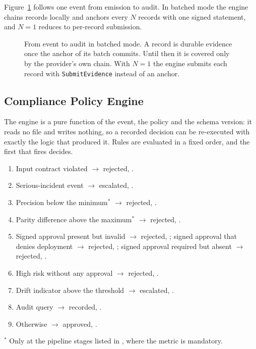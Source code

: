 Figure~\ref{fig:sequence} follows one event from emission to audit. In batched mode the engine chains records locally and anchors every $N$ records with one signed statement, and $N=1$ reduces to per-record submission.

\begin{figure}[t]
\centering
\resizebox{\textwidth}{!}{}
\caption{From event to audit in batched mode. A record is durable evidence once the anchor of its batch commits. Until then it is covered only by the provider's own chain. With $N=1$ the engine submits each record with \texttt{SubmitEvidence} instead of an anchor.}
\label{fig:sequence}
\end{figure}

\subsection{Compliance Policy Engine}

The engine is a pure function of the event, the policy and the schema version: it reads no file and writes nothing, so a recorded decision can be re-executed with exactly the logic that produced it. Rules are evaluated in a fixed order, and the first that fires decides.

\begin{enumerate}[label=\arabic*., leftmargin=*, itemsep=1pt, topsep=3pt]\footnotesize
\item Input contract violated $\rightarrow$ rejected, .
\item Serious-incident event $\rightarrow$ escalated, .
\item Precision below the minimum$^{*}$ $\rightarrow$ rejected, .
\item Parity difference above the maximum$^{*}$ $\rightarrow$ rejected, .
\item Signed approval present but invalid $\rightarrow$ rejected, ; signed approval that denies deployment $\rightarrow$ rejected, ; signed approval required but absent $\rightarrow$ rejected, .
\item High risk without any approval $\rightarrow$ rejected, .
\item Drift indicator above the threshold $\rightarrow$ escalated, .
\item Audit query $\rightarrow$ recorded, .
\item Otherwise $\rightarrow$ approved, .
\end{enumerate}
{\footnotesize $^{*}$ Only at the pipeline stages listed in , where the metric is mandatory.}


